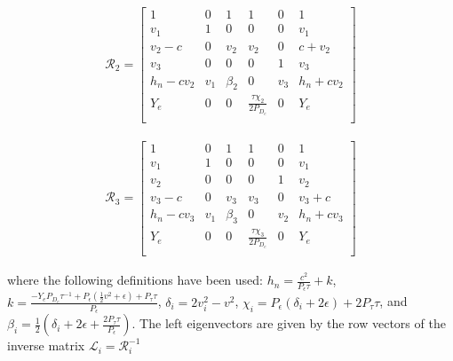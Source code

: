 \begin{align*}
  \mathcal{R}_{2} =
  \left[
  \begin{array}{cccccc}
    1 & 0 & 1 & 1 & 0 & 1 \\
    v_{1} & 1 & 0 & 0 & 0 & v_{1} \\
    v_{2}-c & 0 & v_{2} & v_{2} & 0 & c+v_{2} \\
    v_{3} & 0 & 0 & 0 & 1 & v_{3} \\
    h_{n}-c v_{2} & v_{1} & \beta_{2} & 0 & v_{3} & h_{n}+c v_{2} \\
    Y_{e}  & 0 & 0 & \frac{\tau  \chi_{2} }{2 P_{D_{e}}} & 0 & Y_{e}  \\
  \end{array}
  \right]
\end{align*}

\begin{align*}
  \mathcal{R}_{3} =
  \left[
  \begin{array}{cccccc}
    1 & 0 & 1 & 1 & 0 & 1 \\
    v_{1} & 1 & 0 & 0 & 0 & v_{1} \\
    v_{2} & 0 & 0 & 0 & 1 & v_{2} \\
    v_{3}-c & 0 & v_{3} & v_{3} & 0 & v_{3}+c \\
    h_{n}-c v_{3} & v_{1} & \beta_{3} & 0 & v_{2} & h_{n}+c v_{3} \\
    Y_{e}  & 0 & 0 & \frac{\tau  \chi_{3} }{2 P_{D_{e}}} & 0 & Y_{e}  \\
  \end{array}
  \right]
\end{align*}

where the following definitions have been used:
$h_{n} = \frac{c^2}{P_{\epsilon}\tau} + k $, $k = \frac{-Y_{e} P_{D_{e}} \tau^{-1}
+ P_{\epsilon} (\frac{1}{2}v^2 + \epsilon) + P_{\tau}\tau}{P_{\epsilon}}$,
$\delta_{i} = 2v_{i}^{2}-v^{2}$,
$\chi_{i} = P_{\epsilon} ( \delta_{i} + 2\epsilon) + 2P_{\tau}\tau$, and
$\beta_{i} = \frac{1}{2} (\delta_{i}+2 \epsilon +\frac{2 P_{\tau} \tau }{P_{\epsilon}})$.
The left eigenvectors are given by the row vectors of the inverse matrix $\mathcal{L}_{i} = \mathcal{R}_{i}^{-1}$

